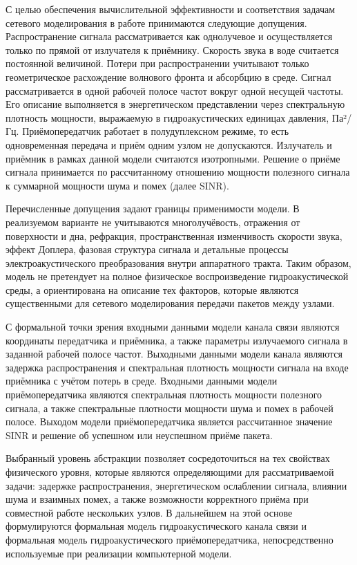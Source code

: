 С целью обеспечения вычислительной эффективности и соответствия задачам
сетевого моделирования в работе принимаются следующие допущения.
Распространение сигнала рассматривается как однолучевое и осуществляется
только по прямой от излучателя к приёмнику. Скорость звука в воде
считается постоянной величиной. Потери при распространении учитывают
только геометрическое расхождение волнового фронта и абсорбцию в среде.
Сигнал рассматривается в одной рабочей полосе частот вокруг одной
несущей частоты. Его описание выполняется в энергетическом представлении
через спектральную плотность мощности, выражаемую в гидроакустических
единицах давления, Па²/Гц. Приёмопередатчик работает в полудуплексном
режиме, то есть одновременная передача и приём одним узлом не
допускаются. Излучатель и приёмник в рамках данной модели считаются
изотропными. Решение о приёме сигнала принимается по рассчитанному
отношению мощности полезного сигнала к суммарной мощности шума и помех
(далее SINR).

Перечисленные допущения задают границы применимости модели. В
реализуемом варианте не учитываются многолучёвость, отражения от
поверхности и дна, рефракция, пространственная изменчивость скорости
звука, эффект Доплера, фазовая структура сигнала и детальные процессы
электроакустического преобразования внутри аппаратного тракта. Таким
образом, модель не претендует на полное физическое воспроизведение
гидроакустической среды, а ориентирована на описание тех факторов,
которые являются существенными для сетевого моделирования передачи
пакетов между узлами.

С формальной точки зрения входными данными модели канала связи являются
координаты передатчика и приёмника, а также параметры излучаемого
сигнала в заданной рабочей полосе частот. Выходными данными модели
канала являются задержка распространения и спектральная плотность
мощности сигнала на входе приёмника с учётом потерь в среде. Входными
данными модели приёмопередатчика являются спектральная плотность
мощности полезного сигнала, а также спектральные плотности мощности шума
и помех в рабочей полосе. Выходом модели приёмопередатчика является
рассчитанное значение SINR и решение об успешном или неуспешном приёме
пакета.

Выбранный уровень абстракции позволяет сосредоточиться на тех свойствах
физического уровня, которые являются определяющими для рассматриваемой
задачи: задержке распространения, энергетическом ослаблении сигнала,
влиянии шума и взаимных помех, а также возможности корректного приёма
при совместной работе нескольких узлов. В дальнейшем на этой основе
формулируются формальная модель гидроакустического канала связи и
формальная модель гидроакустического приёмопередатчика, непосредственно
используемые при реализации компьютерной модели.

